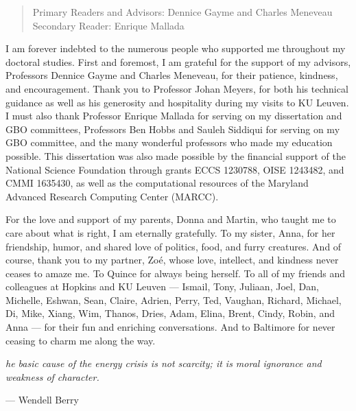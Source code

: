 \begin{frontmatter}
\begin{abstract}
\vspace{1cm}

\noindent Primary Readers and Advisors: Dennice Gayme and Charles Meneveau\\
Secondary Reader: Enrique Mallada

\end{abstract}

\begin{acknowledgment}

I am forever indebted to the numerous people who supported me throughout my doctoral studies. First and foremost, I am grateful for the support of my advisors, Professors Dennice Gayme and Charles Meneveau, for their patience, kindness, and encouragement. Thank you to Professor Johan Meyers, for both his technical guidance as well as his generosity and hospitality during my visits to KU Leuven. I must also thank Professor Enrique Mallada for serving on my dissertation and GBO committees, Professors Ben Hobbs and Sauleh Siddiqui for serving on my GBO committee, and the many wonderful professors who made my education possible. This dissertation was also made possible by the financial support of the National Science Foundation through grants ECCS 1230788, OISE 1243482, and CMMI 1635430, as well as the computational resources of the Maryland Advanced Research Computing Center (MARCC).

For the love and support of my parents, Donna and Martin, who taught me to care about what is right, I am eternally gratefully. To my sister, Anna, for her friendship, humor, and shared love of politics, food, and furry creatures. And of course, thank you to my partner, Zo\'{e}, whose love, intellect, and kindness never ceases to amaze me. To Quince for always being herself. To all of my friends and colleagues at Hopkins and KU Leuven --- Ismail, Tony, Juliaan, Joel, Dan, Michelle, Eshwan, Sean, Claire, Adrien, Perry, Ted, Vaughan, Richard, Michael, Di, Mike, Xiang, Wim, Thanos, Dries, Adam, Elina, Brent, Cindy, Robin, and Anna --- for their fun and enriching conversations. And to Baltimore for never ceasing to charm me along the way.

\end{acknowledgment}

\begin{dedication}
\vfil
{\it 
\noindent [T]he basic cause of the energy crisis is not scarcity; it is moral ignorance and weakness of character.}~\cite{Berry1996a}
\begin{flushright}
--- Wendell Berry
\end{flushright}
\vfil
\end{dedication}


\end{frontmatter}
